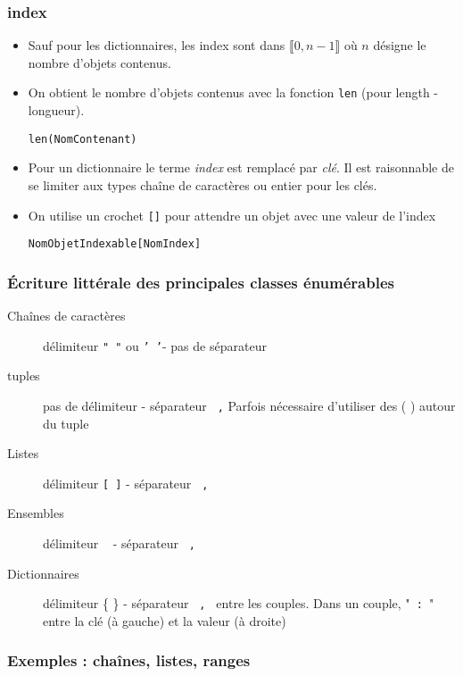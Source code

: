 \begin{frame}
  \frametitle{index}
  \begin{itemize}
    \item Sauf pour les dictionnaires, les index sont dans $\llbracket 0, n-1 \rrbracket$ où $n$ désigne le nombre d'objets contenus.
    \item On obtient le nombre d'objets contenus avec la fonction \texttt{len} (pour length -longueur).
      \begin{center}
        \texttt{len(NomContenant)}
      \end{center}
    \item Pour un dictionnaire le terme \emph{index} est remplacé par \emph{clé}. Il est raisonnable de se limiter aux types chaîne de caractères ou entier pour les clés.
    \item On utilise un crochet \texttt{[]} pour attendre un objet avec une valeur de l'index
      \begin{center}
        \texttt{NomObjetIndexable[NomIndex]}
      \end{center}
  \end{itemize}
\end{frame}

\begin{frame}
  \frametitle{\'Ecriture littérale des principales classes énumérables}
  \begin{description}
    \item [Chaînes de caractères] délimiteur \texttt{" "} ou \texttt{' '}- pas de séparateur
    \item [tuples] pas de délimiteur - séparateur \texttt{ ,}\newline
    Parfois nécessaire d'utiliser des ( ) autour du tuple
    \item [Listes] délimiteur \texttt{[ ]} - séparateur \texttt{ , }
    \item [Ensembles] délimiteur \texttt{{ }} - séparateur \texttt{ ,}
    \item [Dictionnaires] délimiteur \{ \} - séparateur \texttt{ , } entre les couples.\newline
    Dans un couple, "\texttt{ : }" entre la clé (à gauche) et la valeur (à droite)
  \end{description}
\end{frame}

\begin{frame}
  \frametitle{Exemples : chaînes, listes, ranges}
    
\end{frame}

